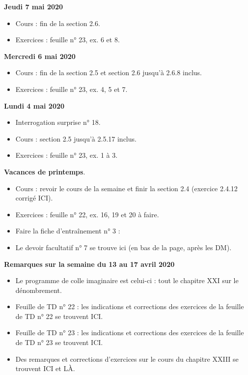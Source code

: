 \documentclass[12pt,a4paper]{article}
\begin{document}
\noindent\textbf{Jeudi 7 mai 2020}
\begin{itemize}
\item Cours : fin de la section 2.6.
\item Exercices : feuille n° 23, ex. 6 et 8.\vspace{.4cm}
\end{itemize}
 
\noindent\textbf{Mercredi 6 mai 2020}
\begin{itemize}
\item Cours : fin de la section 2.5 et section 2.6 jusqu'à 2.6.8 inclus.
\item Exercices : feuille n° 23, ex. 4, 5 et 7.\vspace{.4cm}
\end{itemize}
 
\noindent\textbf{Lundi 4 mai 2020}
\begin{itemize}
\item Interrogation surprise n° 18.
\item Cours : section 2.5 jusqu'à 2.5.17 inclus.
\item Exercices : feuille n° 23, ex. 1 à 3.\vspace{.4cm}
\end{itemize}
 
\noindent\textbf{\bf Vacances de printemps}.\vspace{.4cm}\\
\begin{itemize}
\item Cours : revoir le cours de la semaine et finir la section 2.4 (exercice 2.4.12 corrigé ICI).
\item Exercices : feuille n° 22, ex. 16, 19 et 20 à faire.
\item Faire la fiche d'entraînement n° 3 : 
\item Le devoir facultatif n° 7 se trouve ici (en bas de la page, après les DM).
\vspace{.4cm}
\end{itemize}

\noindent\textbf{\bf Remarques sur la semaine du 13 au 17 avril 2020}
\begin{itemize}
\item Le programme de colle imaginaire est celui-ci : tout le chapitre XXI sur le dénombrement.
\item Feuille de TD n° 22 : les indications et corrections des exercices de la feuille de TD n° 22 se trouvent ICI.
\item Feuille de TD n° 23 : les indications et corrections des exercices de la feuille de TD n° 23 se trouvent ICI.
\item Des remarques et corrections d'exercices sur le cours du chapitre XXIII se trouvent ICI et LÀ.\vspace{.4cm}
\end{itemize}
\end{document}
